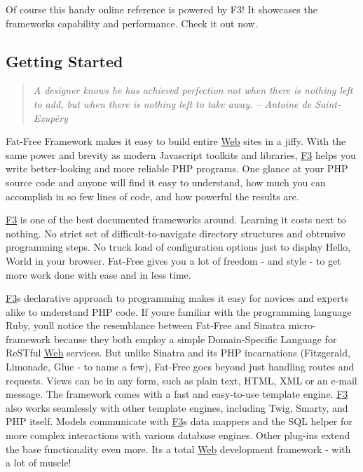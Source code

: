 Of course this handy online reference is powered by F3! It showcases the framework\textquotesingle{}s capability and performance. Check it out now.

\subsection*{Getting Started}

\begin{quote}
{\itshape A designer knows he has achieved perfection not when there is nothing left to add, but when there is nothing left to take away. -- Antoine de Saint-\/\+Exupéry} \end{quote}


Fat-\/\+Free Framework makes it easy to build entire \hyperlink{class_web}{Web} sites in a jiffy. With the same power and brevity as modern Javascript toolkits and libraries, \hyperlink{class_f3}{F3} helps you write better-\/looking and more reliable P\+HP programs. One glance at your P\+HP source code and anyone will find it easy to understand, how much you can accomplish in so few lines of code, and how powerful the results are.

\hyperlink{class_f3}{F3} is one of the best documented frameworks around. Learning it costs next to nothing. No strict set of difficult-\/to-\/navigate directory structures and obtrusive programming steps. No truck load of configuration options just to display {\ttfamily \textquotesingle{}Hello, World\textquotesingle{}} in your browser. Fat-\/\+Free gives you a lot of freedom -\/ and style -\/ to get more work done with ease and in less time.

\hyperlink{class_f3}{F3}\textquotesingle{}s declarative approach to programming makes it easy for novices and experts alike to understand P\+HP code. If you\textquotesingle{}re familiar with the programming language Ruby, you\textquotesingle{}ll notice the resemblance between Fat-\/\+Free and Sinatra micro-\/framework because they both employ a simple Domain-\/\+Specific Language for Re\+S\+Tful \hyperlink{class_web}{Web} services. But unlike Sinatra and its P\+HP incarnations (Fitzgerald, Limonade, Glue -\/ to name a few), Fat-\/\+Free goes beyond just handling routes and requests. Views can be in any form, such as plain text, H\+T\+ML, X\+ML or an e-\/mail message. The framework comes with a fast and easy-\/to-\/use template engine. \hyperlink{class_f3}{F3} also works seamlessly with other template engines, including Twig, Smarty, and P\+HP itself. Models communicate with \hyperlink{class_f3}{F3}\textquotesingle{}s data mappers and the S\+QL helper for more complex interactions with various database engines. Other plug-\/ins extend the base functionality even more. It\textquotesingle{}s a total \hyperlink{class_web}{Web} development framework -\/ with a lot of muscle!

